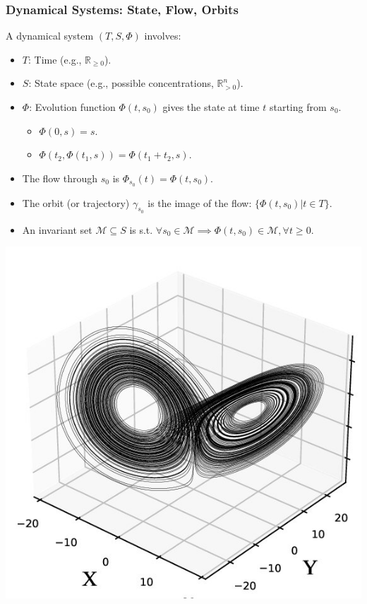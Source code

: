 \documentclass[aspectratio=169]{beamer}
\begin{document}
\begin{frame}{\insertsectionhead}
	\frametitle{Dynamical Systems: State, Flow, Orbits}
	A dynamical system $(T, S, \Phi)$ involves:
	\begin{itemize}
		\item $T$: Time (e.g., $\mathbb{R}_{\ge 0}$).
		\item $S$: State space (e.g., possible concentrations, $\mathbb{R}^n_{>0}$).
		\item $\Phi$: Evolution function $\Phi(t, s_0)$ gives the state at time $t$ starting from $s_0$.
			\begin{itemize}
				\item $\Phi(0, s) = s$.
				\item $\Phi(t_2, \Phi(t_1, s)) = \Phi(t_1+t_2, s)$.
			\end{itemize}
		\item The \alert{flow} through $s_0$ is $\Phi_{s_0}(t) = \Phi(t,s_0)$.
		\item The \alert{orbit} (or trajectory) $\gamma_{s_0}$ is the image of the flow: $\{\Phi(t,s_0) | t \in T\}$.
		\item An \alert{invariant set} $\mathcal{M} \subseteq S$ is s.t. $\forall s_0 \in \mathcal{M} \implies \Phi(t,s_0) \in \mathcal{M}, \forall t \ge 0$.
	\end{itemize}
\end{frame}

\begin{frame}
	\centering
	\includegraphics[width=0.6\linewidth]{pics/lorenz.jpg}\\
\end{frame}
\end{document}
